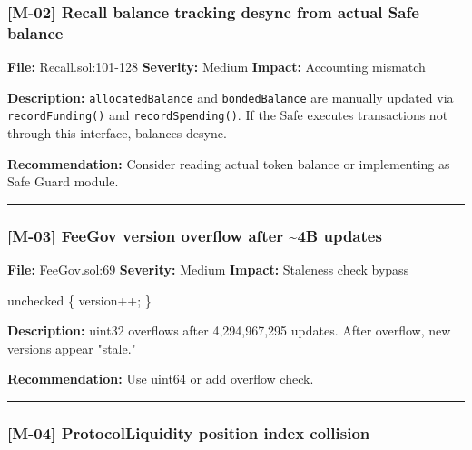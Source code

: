 \documentclass[
]{article}
\newenvironment{Shaded}{}{}
\newcommand{\NormalTok}[1]{#1}
\begin{document}
\subsubsection{{[}M-02{]} Recall balance tracking desync from actual
Safe
balance}\label{m-02-recall-balance-tracking-desync-from-actual-safe-balance}

\textbf{File:} Recall.sol:101-128 \textbf{Severity:} Medium
\textbf{Impact:} Accounting mismatch

\textbf{Description:} \texttt{allocatedBalance} and
\texttt{bondedBalance} are manually updated via \texttt{recordFunding()}
and \texttt{recordSpending()}. If the Safe executes transactions not
through this interface, balances desync.

\textbf{Recommendation:} Consider reading actual token balance or
implementing as Safe Guard module.

\begin{center}\rule{0.5\linewidth}{0.5pt}\end{center}

\subsubsection{{[}M-03{]} FeeGov version overflow after
\textasciitilde4B
updates}\label{m-03-feegov-version-overflow-after-4b-updates}

\textbf{File:} FeeGov.sol:69 \textbf{Severity:} Medium \textbf{Impact:}
Staleness check bypass

\begin{Shaded}
\begin{Highlighting}[]
\NormalTok{unchecked \{ version++; \}}
\end{Highlighting}
\end{Shaded}

\textbf{Description:} uint32 overflows after 4,294,967,295 updates.
After overflow, new versions appear "stale."

\textbf{Recommendation:} Use uint64 or add overflow check.

\begin{center}\rule{0.5\linewidth}{0.5pt}\end{center}

\subsubsection{{[}M-04{]} ProtocolLiquidity position index
collision}\label{m-04-protocolliquidity-position-index-collision}
\end{document}
